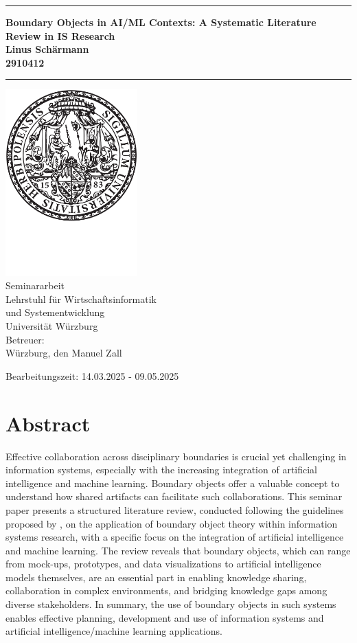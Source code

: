 \documentclass[12pt,oneside]{article}
\newcommand{\JMUTitle}[9]{

  \thispagestyle{empty}
  \vspace*{\stretch{1}}
  {\parindent0cm
  \rule{\linewidth}{.7ex}}
  \begin{flushright}
    \vspace*{\stretch{1}}
    \sffamily\bfseries\Huge
    #1\\
    \vspace*{\stretch{1}}
    \sffamily\bfseries\large
    #2\\
    \vspace*{\stretch{1}}
    \sffamily\bfseries\small
    #3
  \end{flushright}
  \rule{\linewidth}{.7ex}

  \vspace*{\stretch{1}}
  \begin{center}
    \includegraphics[width=2in]{siegel} \\
    \vspace*{\stretch{1}}
    \Large Seminararbeit  \\

    \vspace*{\stretch{2}}
   \large Lehrstuhl f\"{u}r Wirtschaftsinformatik\\
    \large und Systementwicklung\\
    \large Universität Würzburg\\
    \vspace*{\stretch{1}}
    \large Betreuer:  #8 \\[1mm]
    
    \vspace*{\stretch{1}}
    \large W\"urzburg, den #7 \\
        \vspace*{\stretch{0.25}}

    Bearbeitungszeit: 14.03.2025 - 09.05.2025 %

  \end{center}
}
\begin{document}
  \JMUTitle
      {Boundary Objects in AI/ML Contexts: A Systematic Literature Review in IS Research}        %
      {Linus Schärmann}                        %
      {2910412}
      
      {Wirtschaftswissenschaftlichen Fakultät}  %
      {W"urzburg 2025}                          %
      {09.05.2025}                              %
      {Manuel Zall}               %
      {}                          %

  \clearpage

\lhead{}
    \setcounter{page}{1}

\tableofcontents
\clearpage

\newpage
{}
\section*{Abstract}

Effective collaboration across disciplinary boundaries is crucial yet challenging in information systems, especially with the increasing integration of artificial intelligence and machine learning. Boundary objects offer a valuable concept to understand how shared artifacts can facilitate such collaborations. This seminar paper presents a structured literature review, conducted following the guidelines proposed by \citet[43-44]{okoli2015guide}, on the application of boundary object theory within information systems research, with a specific focus on the integration of artificial intelligence and machine learning. The review reveals that boundary objects, which can range from mock-ups, prototypes, and data visualizations to artificial intelligence models themselves, are an essential part in enabling knowledge sharing, collaboration in complex environments, and bridging knowledge gaps among diverse stakeholders. In summary, the use of boundary objects in such systems enables effective planning, development and use of information systems and artificial intelligence/machine learning applications.

\end{document}
